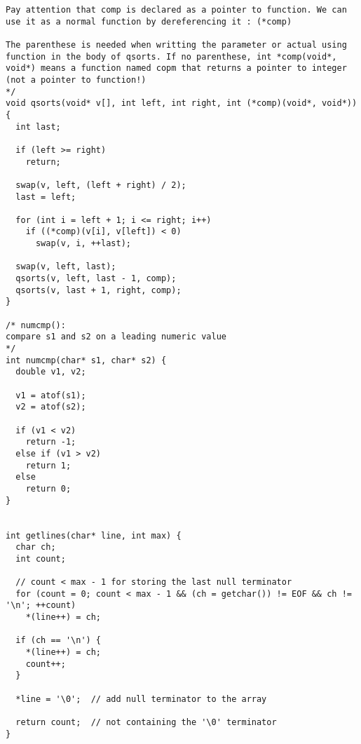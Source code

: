 \documentclass[12pt]{article}
\begin{document}
\begin{verbatim}
Pay attention that comp is declared as a pointer to function. We can use it as a normal function by dereferencing it : (*comp)

The parenthese is needed when writting the parameter or actual using function in the body of qsorts. If no parenthese, int *comp(void*, void*) means a function named copm that returns a pointer to integer (not a pointer to function!)
*/
void qsorts(void* v[], int left, int right, int (*comp)(void*, void*)) {
  int last;

  if (left >= right)
    return;

  swap(v, left, (left + right) / 2);
  last = left;

  for (int i = left + 1; i <= right; i++)
    if ((*comp)(v[i], v[left]) < 0)
      swap(v, i, ++last);

  swap(v, left, last);
  qsorts(v, left, last - 1, comp);
  qsorts(v, last + 1, right, comp);
}

/* numcmp(): 
compare s1 and s2 on a leading numeric value
*/
int numcmp(char* s1, char* s2) {
  double v1, v2;

  v1 = atof(s1);
  v2 = atof(s2);

  if (v1 < v2)
    return -1;
  else if (v1 > v2)
    return 1;
  else 
    return 0;
}


int getlines(char* line, int max) {
  char ch;
  int count;

  // count < max - 1 for storing the last null terminator
  for (count = 0; count < max - 1 && (ch = getchar()) != EOF && ch != '\n'; ++count)
    *(line++) = ch;

  if (ch == '\n') {
    *(line++) = ch;
    count++;
  }

  *line = '\0';  // add null terminator to the array 

  return count;  // not containing the '\0' terminator 
} 
\end{verbatim}
\end{document}
